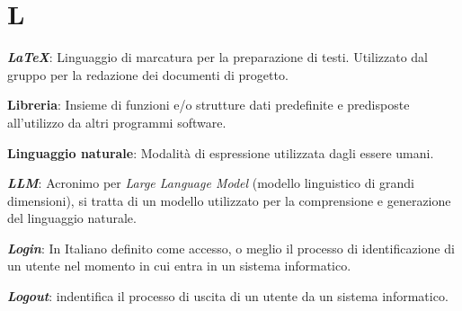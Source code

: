 \documentclass[5pt]{article}
\begin{document}
\pagebreak

\section*{L}
\begin{flushleft}
	
\textbf{\textit{LaTeX}}: Linguaggio di marcatura per la preparazione di testi. Utilizzato dal gruppo per la redazione dei documenti di progetto.\newline

\textbf{Libreria}: Insieme di funzioni e/o strutture dati predefinite e predisposte all'utilizzo da altri programmi software.\newline
	
\textbf{Linguaggio naturale}: Modalità di espressione utilizzata dagli essere umani.\newline

\textbf{\textit{LLM}}: Acronimo per \textit{Large Language Model} (modello linguistico di grandi dimensioni), si tratta di un modello utilizzato per la comprensione e generazione del linguaggio naturale.\newline

\textbf{\textit{Login}}: In Italiano definito come accesso, o meglio il processo di identificazione di un utente nel momento in cui entra in un sistema informatico. \newline

\textbf{\textit{Logout}}: indentifica il processo di uscita di un utente da un sistema informatico.

\end{flushleft}

\pagebreak
\end{document}
